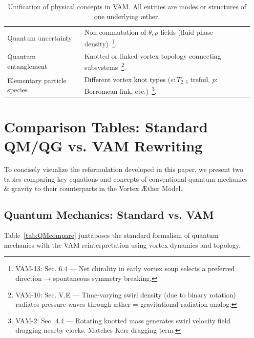 \documentclass[a4paper,12pt]{article}
\begin{document}
\begin{table}[H]
\begin{tabular}{p{} p{}}
            Quantum uncertainty & Non-commutation of $\theta,\rho$ fields (fluid phase–density)~\footnote{VAM-13: Sec. 6.4 — Net chirality in early vortex soup selects a preferred direction → spontaneous symmetry breaking.}. \\
            Quantum entanglement & Knotted or linked vortex topology connecting subsystems~\footnote{VAM-10: Sec. V.E — Time-varying swirl density (due to binary rotation) radiates pressure waves through æther = gravitational radiation analog.}. \\
            Elementary particle species & Different vortex knot types ($e: T_{2,3}$ trefoil, $p$: Borromean link, etc.)~\footnote{VAM-2: Sec. 4.4 — Rotating knotted mass generates swirl velocity field dragging nearby clocks. Matches Kerr dragging term.}. \\
            \hline
        \end{tabular}
        \caption{Unification of physical concepts in VAM. All entities are modes or structures of one underlying æther.}
        \label{tab:unification}
    \end{table}

\section{Comparison Tables: Standard QM/QG vs. VAM Rewriting}
    To concisely visualize the reformulation developed in this paper, we present two tables comparing key equations and concepts of conventional quantum mechanics \& gravity to their counterparts in the Vortex Æther Model.

    \subsection{Quantum Mechanics: Standard vs. VAM}
    Table~\ref{tab:QMcompare} juxtaposes the standard formalism of quantum mechanics with the VAM reinterpretation using vortex dynamics and topology.
\end{document}
